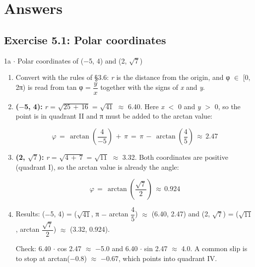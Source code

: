 \documentclass[11pt]{article}
\begin{document}
\section{Answers}
\begin{keepsection}\subsection{Exercise 5.1: Polar coordinates}

\begin{workedbox}{1a \ensuremath{\cdot} Polar coordinates of (\ensuremath{-}5, 4) and (2, \ensuremath{\sqrt{7}})}
\begin{enumerate}
\item Convert with the rules of §3.6: \textit{r} is the distance from the origin, and φ \ensuremath{\in} [0, 2π) is read from tan φ = {\small\ensuremath{\dfrac{{y}}{{x}}}} together with the signs of \textit{x} and \textit{y}.
\item {}
\textbf{(\ensuremath{-}5, 4):} \textit{r} = \ensuremath{\sqrt{25\, +\, 16}} = \ensuremath{\sqrt{41}} \ensuremath{\approx} 6.40. Here \textit{x} \ensuremath{<} 0 and \textit{y} \ensuremath{>} 0, so the point is in quadrant II and π must be added to the arctan value:

\begin{equation*}φ\, =\, \arctan \left(\dfrac{4}{-5}\right)\, +\, π\, =\, π\, -\, \arctan \left(\dfrac{4}{5}\right)\, \approx \, 2.47\end{equation*}
\item {}
\textbf{(2, \ensuremath{\sqrt{7}}):} \textit{r} = \ensuremath{\sqrt{4\, +\, 7}} = \ensuremath{\sqrt{11}} \ensuremath{\approx} 3.32. Both coordinates are positive (quadrant I), so the arctan value is already the angle:

\begin{equation*}φ\, =\, \arctan \left(\dfrac{\sqrt{7}}{2}\right)\, \approx \, 0.924\end{equation*}
\item {}
Results: (\ensuremath{-}5, 4) = (\ensuremath{\sqrt{41}}, π \ensuremath{-} arctan {\small\ensuremath{\dfrac{4}{5}}}) \ensuremath{\approx} (6.40, 2.47) and (2, \ensuremath{\sqrt{7}}) = (\ensuremath{\sqrt{11}}, arctan {\small\ensuremath{\dfrac{\sqrt{7}}{2}}}) \ensuremath{\approx} (3.32, 0.924).

Check: 6.40 \ensuremath{\cdot} cos 2.47 \ensuremath{\approx} \ensuremath{-}5.0 and 6.40 \ensuremath{\cdot} sin 2.47 \ensuremath{\approx} 4.0. A common slip is to stop at arctan(\ensuremath{-}0.8) \ensuremath{\approx} \ensuremath{-}0.67, which points into quadrant IV.
\end{enumerate}
\end{workedbox}

\end{keepsection}
\end{document}
